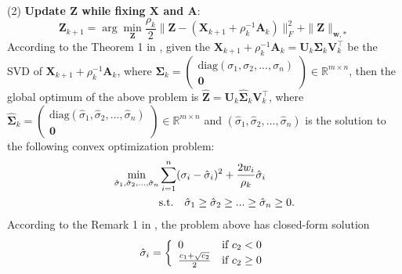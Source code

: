 \documentclass[10pt,twocolumn,letterpaper,sort&compress]{article}
\begin{document}
\\
(2) \textbf{Update $\mathbf{Z}$ while fixing $\mathbf{X}$ and $\mathbf{A}$}:
\vspace{-1mm}
\begin{equation}
\label{e15}
\mathbf{Z}_{k+1}
=
\arg\min_{\mathbf{Z}}\frac{\rho_{k}}{2}
\|\mathbf{Z} - (\mathbf{X}_{k+1}+\rho_{k}^{-1}\mathbf{A}_{k})\|_{F}^{2}
+
\|\mathbf{Z}\|_{\bm{w},*}
\end{equation}
According to the Theorem 1 in \cite{wnnmijcv}, given the $\mathbf{X}_{k+1}+\rho_{k}^{-1}\mathbf{A}_{k}=\mathbf{U}_{k}\mathbf{\Sigma}_{k}\mathbf{V}_{k}^{\top}$ be the SVD of $\mathbf{X}_{k+1}+\rho_{k}^{-1}\mathbf{A}_{k}$, where 
$\mathbf{\Sigma}_{k}=
\left( \begin{array}{c}
\text{diag}(\sigma_{1},\sigma_{2},...,\sigma_{n})
\\
\mathbf{0}
\end{array} \right)
\in\mathbb{R}^{m\times n}$,
then the global optimum of the above problem is 
$\hat{\mathbf{Z}}=\mathbf{U}_{k}\hat{\mathbf{\Sigma}}_{k}\mathbf{V}_{k}^{\top}$, where 
$\hat{\mathbf{\Sigma}}_{k}=
\left( \begin{array}{c}
\text{diag}(\hat{\sigma}_{1},\hat{\sigma}_{2},...,\hat{\sigma}_{n})
\\
\mathbf{0}
\end{array} \right)
\in\mathbb{R}^{m\times n}$
and $(\hat{\sigma}_{1},\hat{\sigma}_{2},...,\hat{\sigma}_{n})$ is the solution to the following convex optimization problem:
\vspace{-1mm}
\begin{equation}
\label{e16}
\vspace{-1mm}
\begin{split}
\min_{\hat{\sigma}_{1},\hat{\sigma}_{2},...,\hat{\sigma}_{n}}
&
\sum_{i=1}^{n}
(\sigma_{i}-\hat{\sigma}_{i})^{2}
+
\frac{2w_{i}}{\rho_{k}}\hat{\sigma}_{i}
\\
&
\text{s.t.}
\quad
\hat{\sigma}_{1}\ge \hat{\sigma}_{2} \ge...\ge \hat{\sigma}_{n}\ge 0.
\end{split}
\end{equation}
According to the Remark 1 in \cite{wnnmijcv}, the problem above has closed-form solution
\vspace{-1mm}
\begin{equation}
\label{e17}
\vspace{-1mm}
\hat{\sigma}_{i}
=
\left\{ \begin{array}{ll}
0 & \textrm{if $c_{2}<0$}\\
\frac{c_{1}+\sqrt{c_{2}}}{2} & \textrm{if $c_{2}\ge 0$}
\end{array} \right.
\end{equation}
\end{document}
